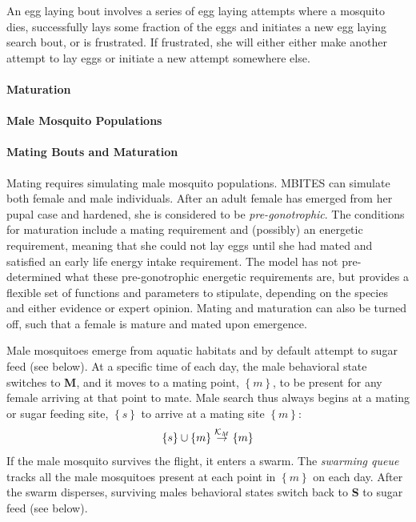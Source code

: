 \documentclass{article}
\begin{document}
An egg laying bout involves a series of egg laying attempts where
a mosquito dies, successfully lays some fraction of the eggs and
initiates a new egg laying search bout, or is frustrated. If
frustrated, she will either either make another attempt to lay
eggs or initiate a new attempt somewhere else.


\paragraph{Maturation}

\paragraph{Male Mosquito Populations}

\paragraph{Mating Bouts and Maturation}

Mating requires simulating male mosquito populations. MBITES can
simulate both female and male individuals. After an adult female
has emerged from her pupal case and hardened, she is considered
to be {\em pre-gonotrophic}. The conditions for maturation
include a mating requirement and (possibly) an energetic
requirement, meaning that she could not lay eggs until she had
mated and satisfied an early life energy intake requirement. The
model has not pre-determined what these pre-gonotrophic energetic
requirements are, but provides a flexible set of functions and
parameters to stipulate, depending on the species and either
evidence or expert opinion. Mating and maturation can also be
turned off, such that a female is mature and mated upon
emergence.

Male mosquitoes emerge from aquatic habitats and by default
attempt to sugar feed (see below). At a specific time of each
day, the male behavioral state switches to {\bf M}, and it moves
to a mating point, $\left\{ m \right\}$, to be present for any
female arriving at that point to mate.
Male search thus always begins at a mating or sugar feeding site,
$\left\{ s \right\} $ to arrive at a mating site $\left\{ m
\right\}$:
%
\begin{equation}
%
\left\{ s\right\} \cup \left\{ m\right\}  \overset{{\cal
K}_M}{\rightarrow} \left\{ m\right\}
%
\end{equation}
%
If the male mosquito survives the flight, it enters a swarm. The
{\em swarming queue} tracks all the male mosquitoes present at
each point in $\left\{ m\right\} $ on each day. After the swarm
disperses, surviving males behavioral states switch back to {\bf
S} to sugar feed (see below).
\end{document}
